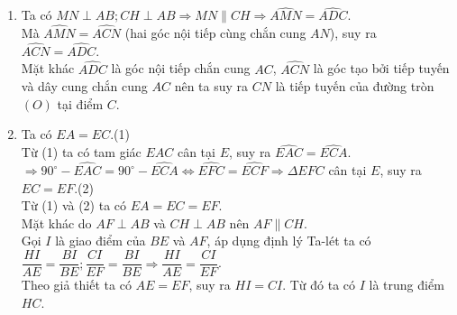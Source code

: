 \begin{ex}
{\begin{enumerate}
    Từ đó suy ra $\tan \widehat{ABC}=\dfrac{HA}{HB}=\dfrac{\sqrt{5}}{5}$.
    \item Ta có $MN\perp AB; CH\perp AB \Rightarrow MN\parallel CH \Rightarrow \widehat{AMN}=\widehat{ADC}$.\\
    Mà $\widehat{AMN}=\widehat{ACN}$ (hai góc nội tiếp cùng chắn cung $AN$), suy ra  $\widehat{ACN}=\widehat{ADC}$.\\
    Mặt khác $\widehat{ADC}$ là góc nội tiếp chắn cung $AC$, $\widehat{ACN}$ là góc tạo bởi tiếp tuyến và dây cung chắn cung $AC$ nên ta suy ra $CN$ là tiếp tuyến của đường tròn $(O)$ tại điểm $C$.
    \item Ta có $EA=EC$.\hfill (1)\\
    Từ (1) ta có tam giác $EAC$ cân tại $E$, suy ra $\widehat{EAC}=\widehat{ECA}$.\\
    $\Rightarrow 90^\circ-\widehat{EAC}=90^\circ-\widehat{ECA}\Leftrightarrow \widehat{EFC}=\widehat{ECF}\Rightarrow \Delta EFC$ cân tại $E$, suy ra $EC=EF$.\hfill (2)\\
    Từ (1) và (2) ta có $EA=EC=EF$.\\
    Mặt khác do $AF\perp AB$ và $CH\perp AB$ nên $AF\parallel CH$.\\
    Gọi $I$ là giao điểm của $BE$ và $AF$, áp dụng định lý Ta-lét ta có\\
    $\dfrac{HI}{AE}=\dfrac{BI}{BE}; \dfrac{CI}{EF}=\dfrac{BI}{BE}\Rightarrow \dfrac{HI}{AE}=\dfrac{CI}{EF}$.\\
    Theo giả thiết ta có $AE=EF$, suy ra $HI=CI$. Từ đó ta có $I$ là trung điểm $HC$.
\end{enumerate}
}
\end{ex}

